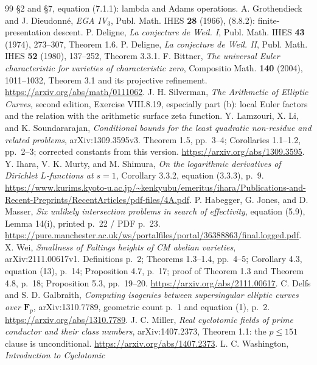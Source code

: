 \documentclass[11pt,a4paper]{article}
\theoremstyle{definition}
\begin{document}
\begin{thebibliography}{99}
\S2 and \S7, equation (7.1.1): lambda and Adams operations.
 A. Grothendieck and J. Dieudonn\'e, \emph{EGA IV$_3$},
Publ. Math. IHES \textbf{28} (1966), (8.8.2): finite-presentation descent.
 P. Deligne, \emph{La conjecture de Weil. I}, Publ. Math.
IHES \textbf{43} (1974), 273--307, Theorem 1.6.
 P. Deligne, \emph{La conjecture de Weil. II}, Publ. Math.
IHES \textbf{52} (1980), 137--252, Theorem 3.3.1.
 F. Bittner, \emph{The universal Euler characteristic
for varieties of characteristic zero}, Compositio Math. \textbf{140}
(2004), 1011--1032, Theorem 3.1 and its projective refinement.
\url{https://arxiv.org/abs/math/0111062}.
 J. H. Silverman, \emph{The Arithmetic of Elliptic
Curves}, second edition, Exercise VIII.8.19, especially part (b): local
Euler factors and the relation with the arithmetic surface zeta function.
 Y. Lamzouri, X. Li, and K. Soundararajan,
\emph{Conditional bounds for the least quadratic non-residue and related
problems}, arXiv:1309.3595v3. Theorem 1.5, pp.~3--4; Corollaries 1.1--1.2,
pp.~2--3; corrected constants from this version.
\url{https://arxiv.org/abs/1309.3595}.
 Y. Ihara, V. K. Murty, and M. Shimura,
\emph{On the logarithmic derivatives of Dirichlet $L$-functions at $s=1$},
Corollary 3.3.2, equation (3.3.3), p.~9.
\url{https://www.kurims.kyoto-u.ac.jp/~kenkyubu/emeritus/ihara/Publications-and-Recent-Preprints/RecentArticles/pdf-files/4A.pdf}.
 P. Habegger, G. Jones, and D. Masser,
\emph{Six unlikely intersection problems in search of effectivity},
equation (5.9), Lemma 14(i), printed p.~22 / PDF p.~23.
\url{https://pure.manchester.ac.uk/ws/portalfiles/portal/36388863/final.logged.pdf}.
 X. Wei, \emph{Smallness of Faltings heights of CM abelian
varieties}, arXiv:2111.00617v1. Definitions p.~2; Theorems 1.3--1.4,
pp.~4--5; Corollary 4.3, equation (13), p.~14; Proposition 4.7, p.~17;
proof of Theorem 1.3 and Theorem 4.8, p.~18; Proposition 5.3, pp.~19--20.
\url{https://arxiv.org/abs/2111.00617}.
 C. Delfs and S. D. Galbraith,
\emph{Computing isogenies between supersingular elliptic curves over
$\mathbf F_p$}, arXiv:1310.7789, geometric count p.~1 and equation (1),
p.~2. \url{https://arxiv.org/abs/1310.7789}.
 J. C. Miller, \emph{Real cyclotomic fields of prime
conductor and their class numbers}, arXiv:1407.2373, Theorem 1.1:
the $p\le151$ clause is unconditional.
\url{https://arxiv.org/abs/1407.2373}.
 L. C. Washington, \emph{Introduction to Cyclotomic
}
\end{thebibliography}
\end{document}
